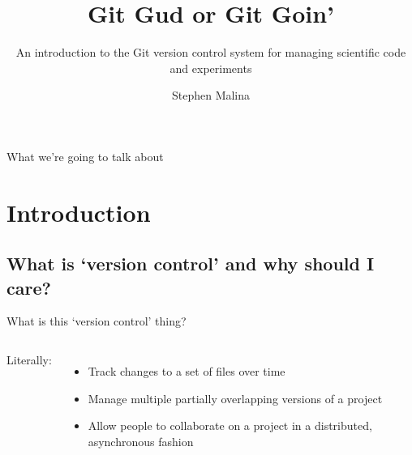 \documentclass[pdf]{beamer} %
\title{Git Gud or Git Goin'}
\subtitle{An introduction to the Git version control system for managing scientific code and experiments}
\author{Stephen Malina}
\begin{document}
\begin{frame}
\titlepage
\end{frame}
\begin{frame}{What we're going to talk about}
    \tableofcontents
\end{frame}

\section{Introduction}
\subsection{What is `version control' and why should I care?}
\begin{frame}[t]{What is this `version control' thing?}
    \begin{columns}
        Literally:
        \begin{itemize}
            \item Track changes to a set of files over time
            \item Manage multiple partially overlapping versions of a project
            \item Allow people to collaborate on a project in a distributed, asynchronous fashion
        \end{itemize}


\end{columns}
\end{frame}
\end{document}
